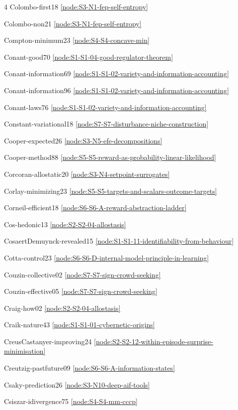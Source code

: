 \documentclass[10pt]{article}
\begin{document}
{\begin{multicols}{4}
Colombo-first18 \hfill \ref{node:S3-N1-fep-self-entropy}\par
Colombo-non21 \hfill \ref{node:S3-N1-fep-self-entropy}\par
Compton-minimum23 \hfill \ref{node:S4-S4-concave-min}\par
Conant-good70 \hfill \ref{node:S1-S1-04-good-regulator-theorem}\par
Conant-information69 \hfill \ref{node:S1-S1-02-variety-and-information-accounting}\par
Conant-information96 \hfill \ref{node:S1-S1-02-variety-and-information-accounting}\par
Conant-laws76 \hfill \ref{node:S1-S1-02-variety-and-information-accounting}\par
Constant-variational18 \hfill \ref{node:S7-S7-disturbance-niche-construction}\par
Cooper-expected26 \hfill \ref{node:S3-N5-efe-decompositions}\par
Cooper-method88 \hfill \ref{node:S5-S5-reward-as-probability-linear-likelihood}\par
Corcoran-allostatic20 \hfill \ref{node:S3-N4-setpoint-surrogates}\par
Corlay-minimizing23 \hfill \ref{node:S5-S5-targets-and-scalars-outcome-targets}\par
Corneil-efficient18 \hfill \ref{node:S6-S6-A-reward-abstraction-ladder}\par
Cos-hedonic13 \hfill \ref{node:S2-S2-04-allostasis}\par
CosaertDemuynck-revealed15 \hfill \ref{node:S1-S1-11-identifiability-from-behaviour}\par
Cotta-control23 \hfill \ref{node:S6-S6-D-internal-model-principle-in-learning}\par
Couzin-collective02 \hfill \ref{node:S7-S7-sign-crowd-seeking}\par
Couzin-effective05 \hfill \ref{node:S7-S7-sign-crowd-seeking}\par
Craig-how02 \hfill \ref{node:S2-S2-04-allostasis}\par
Craik-nature43 \hfill \ref{node:S1-S1-01-cybernetic-origins}\par
CreusCastanyer-improving24 \hfill \ref{node:S2-S2-12-within-episode-surprise-minimisation}\par
Creutzig-pastfuture09 \hfill \ref{node:S6-S6-A-information-states}\par
Csaky-prediction26 \hfill \ref{node:S3-N10-deep-aif-tools}\par
Csiszar-idivergence75 \hfill \ref{node:S4-S4-mm-cccp}\par

\end{multicols}}
\end{document}
